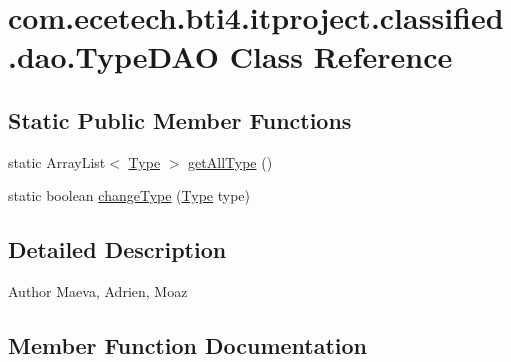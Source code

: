 \hypertarget{classcom_1_1ecetech_1_1bti4_1_1itproject_1_1classified_1_1dao_1_1_type_d_a_o}{}\section{com.\+ecetech.\+bti4.\+itproject.\+classified.\+dao.\+Type\+D\+AO Class Reference}
\label{classcom_1_1ecetech_1_1bti4_1_1itproject_1_1classified_1_1dao_1_1_type_d_a_o}
\subsection*{Static Public Member Functions}
\begin{DoxyCompactItemize}
\item 
static Array\+List$<$ \hyperlink{classcom_1_1ecetech_1_1bti4_1_1itproject_1_1classified_1_1beans_1_1_type}{Type} $>$ \hyperlink{classcom_1_1ecetech_1_1bti4_1_1itproject_1_1classified_1_1dao_1_1_type_d_a_o_af69115a81718e0084ae26106a1a54554}{get\+All\+Type} ()
\item 
static boolean \hyperlink{classcom_1_1ecetech_1_1bti4_1_1itproject_1_1classified_1_1dao_1_1_type_d_a_o_ad711aa6be9097446dd6cc991ad3318c9}{change\+Type} (\hyperlink{classcom_1_1ecetech_1_1bti4_1_1itproject_1_1classified_1_1beans_1_1_type}{Type} type)
\end{DoxyCompactItemize}


\subsection{Detailed Description}
\begin{DoxyAuthor}{Author}
Maeva, Adrien, Moaz 
\end{DoxyAuthor}


\subsection{Member Function Documentation}

